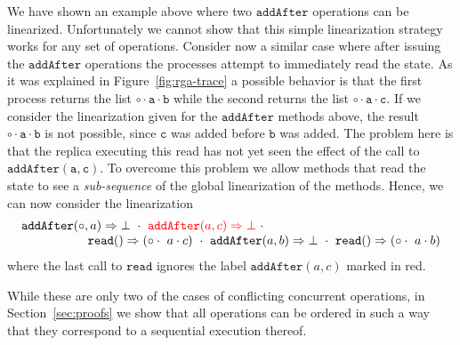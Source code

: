 We have shown an example above where two $\mathtt{addAfter}$
operations can be linearized.
%
Unfortunately we cannot show that this simple linearization strategy
works for any set of operations.
%
Consider now a similar case where after issuing the
$\mathtt{addAfter}$ operations the processes attempt to immediately
read the state.
%
As it was explained in Figure~\ref{fig:rga-trace} a possible behavior is
that the first process returns the list $\mathtt{\circ \cdot a \cdot
  b}$ while the second returns the list $\mathtt{\circ \cdot a \cdot
  c}$. 
%
If we consider the linearization given for the $\mathtt{addAfter}$
methods above, the result $\mathtt{\circ \cdot a \cdot b}$ is not
possible, since $\mathtt{c}$ was added before $\mathtt{b}$ was added.
%
The problem here is that the replica executing this read has not yet
seen the effect of the call to $\mathtt{addAfter(a, c)}$.
%
To overcome this problem we allow methods that read the state to see a
\emph{sub-sequence} of the global linearization of the methods.
%
Hence, we can now consider the linearization 
\[
  \begin{array}{c}
    \alabellong[\mathtt{addAfter}]{\circ,a}{\bot}\ \cdot\
    {\color{red} \alabellong[\mathtt{addAfter}]{a,c}{\bot}}\ \cdot \kern5cm\\    
    \hspace{\fill} \alabellong[\mathtt{read}]{}{(\circ \cdot\ a \cdot c)}\ \cdot\
    \alabellong[\mathtt{addAfter}]{a,b}{\bot}\ \cdot\
    \alabellong[\mathtt{read}]{}{(\circ \cdot\ a \cdot b)}
  \end{array}
\]
where the last call to $\mathtt{read}$ ignores the label
{\color{red} $\mathtt{addAfter}(a, c)$} marked in red.

While these are only two of the cases of conflicting concurrent
operations, in Section~\ref{sec:proofs} we show that all operations
can be ordered in such a way that they correspond to a sequential
execution thereof.


